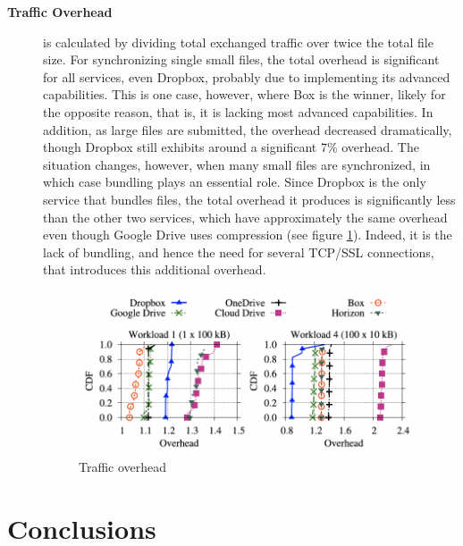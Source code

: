 \begin{description}
	\item[\textbf{Traffic Overhead}] is calculated by dividing total exchanged traffic over twice the total file size. For synchronizing single small files, the total overhead is significant for all services, even Dropbox, probably due to implementing its advanced capabilities. This is one case, however, where Box is the winner, likely for the opposite reason, that is, it is lacking most advanced capabilities. In addition, as large files are submitted, the overhead decreased dramatically, though Dropbox still exhibits around a significant 7\% overhead. The situation changes, however, when many small files are synchronized, in which case bundling plays an essential role. Since Dropbox is the only service that bundles files, the total overhead it produces is significantly less than the other two services, which have approximately the same overhead even though Google Drive uses compression (see figure \ref{fig:traffic overhead}). Indeed, it is the lack of bundling, and hence the need for several TCP/SSL connections, that introduces this additional overhead.
	
	\begin{figure} [h]
		\centering
		\includegraphics[scale=0.7]{images/traffic_overhead}
		\caption{\label{fig:traffic overhead}Traffic overhead}
	\end{figure}

\end{description}

\section{Conclusions} 
